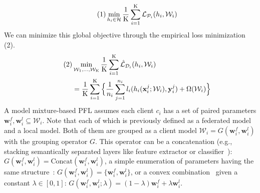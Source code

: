 \documentclass[sigconf]{acmart}
\newcommand\numberthis{\addtocounter{equation}{1}\tag{\theequation}}
\begin{document}
\vspace{-2mm}
\begin{align*}\numberthis
\min_{h_i\in\mathcal{H}}\frac{1}{\mathrm{K}}\sum_{i=1}^{\mathrm{K}}\mathcal{L}_{\mathcal{P}_i}(h_i, \mathcal{W}_i)
\end{align*}
We can minimize this global objective through the empirical loss minimization (2).
\begin{align*}\numberthis
&\min_{\mathcal{W}_1,...,\mathcal{W}_\mathrm{K}}\frac{1}{\mathrm{K}}\sum_{i=1}^{\mathrm{K}}\hat{\mathcal{L}}_{\mathcal{D}_i}(h_i, \mathcal{W}_i) \\
&=\frac{1}{\mathrm{K}}\sum_{i=1}^{\mathrm{K}}\Big\{{\frac{1}{n_i}\sum_{j=1}^{n_i} {l}_i(h_i(\mathbf{x}_i^j;\mathcal{W}_i),\mathbf{y}_i^j)+\Omega(\mathcal{W}_i)}\Big\}
\end{align*} 
A model mixture-based PFL assumes each client $c_i$ has a set of paired parameters $\mathbf{w}_i^{f}, \mathbf{w}_i^{l}\subseteq\mathcal{W}_i$. Note that each of which is previously defined as a federated model and a local model. 
Both of them are grouped as a client model $\mathcal{W}_i=G(\mathbf{w}_i^{f}, \mathbf{w}_i^{l})$ with the grouping operator $G$. This operator can be a concatenation (e.g., stacking semantically separated layers like feature extractor or classifier~\cite{fedrep, FedPer, lgfedavg}): $G(\mathbf{w}_i^{f}, \mathbf{w}_i^{l})=\text{Concat}(\mathbf{w}_i^{f}, \mathbf{w}_i^{l})$, a simple enumeration of parameters having the same structure~\cite{ditto, pfedme}: $G(\mathbf{w}_i^{f}, \mathbf{w}_i^{l})=\{\mathbf{w}_i^{f}, \mathbf{w}_i^{l}\}$, or a convex combination~\cite{apfl,mansour+20,l2sgd} given a constant $\lambda\in[0,1]$: $G(\mathbf{w}_i^{f}, \mathbf{w}_i^{l};\lambda)=(1-\lambda)\mathbf{w}_i^{f}+\lambda\mathbf{w}_i^{l}$. 
\end{document}
